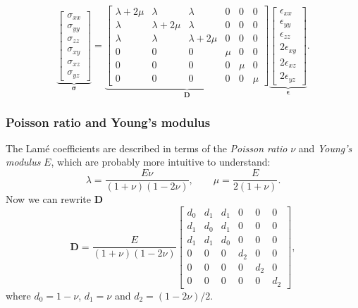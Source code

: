 \documentclass[acmtog]{acmart}
\begin{document}
\begin{equation}
  \underbrace{ \begin{bmatrix}
      \sigma_{xx} \\
      \sigma_{yy} \\
      \sigma_{zz} \\
      \sigma_{xy} \\
      \sigma_{xz} \\
      \sigma_{yz}
    \end{bmatrix} }_{ \boldsymbol \sigma } = \underbrace{ \begin{bmatrix}
      \lambda + 2 \mu & \lambda         & \lambda         & 0   & 0   & 0   \\
      \lambda         & \lambda + 2 \mu & \lambda         & 0   & 0   & 0   \\
      \lambda         & \lambda         & \lambda + 2 \mu & 0   & 0   & 0   \\
      0               & 0               & 0               & \mu & 0   & 0   \\
      0               & 0               & 0               & 0   & \mu & 0   \\
      0               & 0               & 0               & 0   & 0   & \mu
    \end{bmatrix} }_{ \boldsymbol D } \underbrace{ \begin{bmatrix}
      \epsilon_{xx}   \\
      \epsilon_{yy}   \\
      \epsilon_{zz}   \\
      2 \epsilon_{xy} \\
      2 \epsilon_{xz} \\
      2 \epsilon_{yz}
    \end{bmatrix} }_{ \boldsymbol \epsilon }.
\end{equation}
%

\subsubsection{Poisson ratio and Young's modulus}
The Lamé coefficients are described in terms of the \textit{Poisson ratio}  $\nu$ and
\textit{Young's modulus}  $E$, which are probably more intuitive to understand:
%
\begin{equation}
  \lambda = \frac{E \nu}{(1 + \nu)(1 - 2 \nu)}, \qquad \mu = \frac{E}{2(1+ \nu)}.
\end{equation}
%
Now we can rewrite $\boldsymbol D$
%
\begin{equation}
  \boldsymbol D = \frac{E}{(1+\nu)(1-2\nu)}\begin{bmatrix}
    d_0 & d_1 & d_1 & 0   & 0   & 0   \\
    d_1 & d_0 & d_1 & 0   & 0   & 0   \\
    d_1 & d_1 & d_0 & 0   & 0   & 0   \\
    0   & 0   & 0   & d_2 & 0   & 0   \\
    0   & 0   & 0   & 0   & d_2 & 0   \\
    0   & 0   & 0   & 0   & 0   & d_2
  \end{bmatrix},
\end{equation}
%
where $d_0 = 1- \nu$, $d_1 = \nu$ and $d_2 = (1-2\nu) / 2$.
\end{document}
